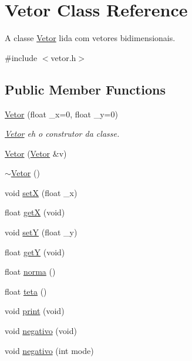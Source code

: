 \hypertarget{class_vetor}{}\section{Vetor Class Reference}
\label{class_vetor}


A classe \hyperlink{class_vetor}{Vetor} lida com vetores bidimensionais.  




{\ttfamily \#include $<$vetor.\+h$>$}

\subsection*{Public Member Functions}
\begin{DoxyCompactItemize}
\item 
\hyperlink{class_vetor_a475c943b2c1db890afc6c7958edea303}{Vetor} (float \+\_\+x=0, float \+\_\+y=0)
\begin{DoxyCompactList}\small\item\em \hyperlink{class_vetor}{Vetor} eh o construtor da classe. \end{DoxyCompactList}\item 
\hyperlink{class_vetor_a63ba9d34a0a98b151f3d85c2b4f54278}{Vetor} (\hyperlink{class_vetor}{Vetor} \&v)
\item 
\hyperlink{class_vetor_a7396a0492de44676a977c593d36e061c}{$\sim$\+Vetor} ()
\item 
void \hyperlink{class_vetor_a45e972d26987116ae8c89fefb09f5737}{setX} (float \+\_\+x)
\item 
float \hyperlink{class_vetor_a0b43068a518a1b9e42a2031aa6c41f0d}{getX} (void)
\item 
void \hyperlink{class_vetor_a25c01341d46beebd3f4bf054d576772e}{setY} (float \+\_\+y)
\item 
float \hyperlink{class_vetor_aec52a87477cfeb998a1668abae852373}{getY} (void)
\item 
float \hyperlink{class_vetor_a26e8c7db35c90a9313cfcb780a1ab324}{norma} ()
\item 
float \hyperlink{class_vetor_ab9cd8d5a657eee8a0e0b4cda209b931d}{teta} ()
\item 
void \hyperlink{class_vetor_a253a700dc67db860e2ae8247f114990e}{print} (void)
\item 
void \hyperlink{class_vetor_a77932d982688b592b82c189e08ad94d1}{negativo} (void)
\item 
void \hyperlink{class_vetor_a1374cc636a82d6f038219fd29891133e}{negativo} (int mode)
\item 

\end{DoxyCompactItemize}
